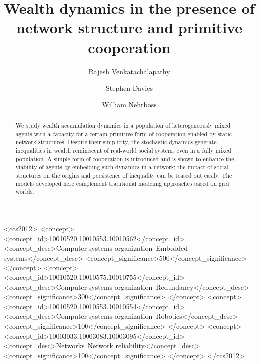 \documentclass[sigconf]{acmart}
\begin{document}
\title{Wealth dynamics in the presence of\\network structure and primitive cooperation}

\author{Rajesh Venkatachalapathy}

\author{Stephen Davies}

\author{William Nehrboss}




\begin{abstract}
We study wealth accumulation dynamics in a population of heterogeneously mixed agents with a capacity for a certain primitive form of cooperation enabled by static network structures. Despite their simplicity, the stochastic dynamics generate inequalities in wealth reminiscent of real-world social systems even in a fully mixed population. A simple form of cooperation is introduced and is shown to enhance the viability of agents by embedding such dynamics in a network; the impact of social structures on the origins and persistence of inequality can be teased out easily. The models developed here complement traditional modeling approaches based on grid worlds.   

\end{abstract}

%
%
\begin{CCSXML}
<ccs2012>
 <concept>
  <concept_id>10010520.10010553.10010562</concept_id>
  <concept_desc>Computer systems organization~Embedded systems</concept_desc>
  <concept_significance>500</concept_significance>
 </concept>
 <concept>
  <concept_id>10010520.10010575.10010755</concept_id>
  <concept_desc>Computer systems organization~Redundancy</concept_desc>
  <concept_significance>300</concept_significance>
 </concept>
 <concept>
  <concept_id>10010520.10010553.10010554</concept_id>
  <concept_desc>Computer systems organization~Robotics</concept_desc>
  <concept_significance>100</concept_significance>
 </concept>
 <concept>
  <concept_id>10003033.10003083.10003095</concept_id>
  <concept_desc>Networks~Network reliability</concept_desc>
  <concept_significance>100</concept_significance>
 </concept>
</ccs2012>
\end{CCSXML}
\end{document}
